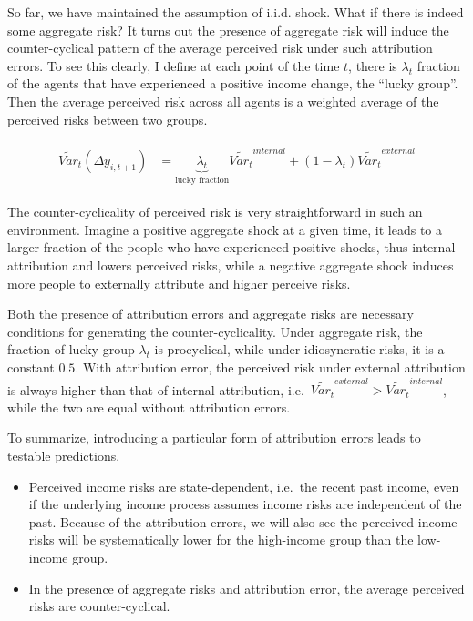 \documentclass[12pt,notitlepage,onecolumn,aps,pra]{article}
\begin{document}
So far, we have maintained the assumption of i.i.d. shock. What if there
is indeed some aggregate risk? It turns out the presence of aggregate
risk will induce the counter-cyclical pattern of the average perceived
risk under such attribution errors. To see this clearly, I define at
each point of the time \(t\), there is \(\lambda_t\) fraction of the
agents that have experienced a positive income change, the ``lucky
group''. Then the average perceived risk across all agents is a weighted
average of the perceived risks between two groups.

\begin{eqnarray}
\begin{split}
\tilde {Var}_{t}(\Delta y_{i,t+1}) & = \underbrace{\lambda_t}_{\text{lucky fraction}} \tilde{Var_t}^{internal} + (1-\lambda_t) \tilde{Var_t}^{external} 
\end{split}
\end{eqnarray}

The counter-cyclicality of perceived risk is very straightforward in
such an environment. Imagine a positive aggregate shock at a given time,
it leads to a larger fraction of the people who have experienced
positive shocks, thus internal attribution and lowers perceived risks,
while a negative aggregate shock induces more people to externally
attribute and higher perceive risks.

Both the presence of attribution errors and aggregate risks are
necessary conditions for generating the counter-cyclicality. Under
aggregate risk, the fraction of lucky group \(\lambda_t\) is
procyclical, while under idiosyncratic risks, it is a constant \(0.5\).
With attribution error, the perceived risk under external attribution is
always higher than that of internal attribution,
i.e.~\(\tilde{Var_t}^{external} >\tilde{Var_t}^{internal}\), while the
two are equal without attribution errors.

To summarize, introducing a particular form of attribution errors leads
to testable predictions.

\begin{itemize}
\item
  Perceived income risks are state-dependent, i.e.~the recent past
  income, even if the underlying income process assumes income risks are
  independent of the past. Because of the attribution errors, we will
  also see the perceived income risks will be systematically lower for
  the high-income group than the low-income group.
\item
  In the presence of aggregate risks and attribution error, the average
  perceived risks are counter-cyclical.
\end{itemize}
\end{document}
